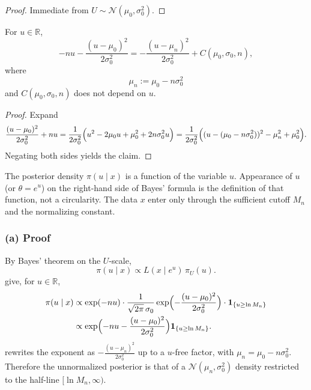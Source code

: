 \documentclass[11pt,a4paper]{article}
\begin{document}
\begin{proof}
Immediate from \(U\sim\mathcal{N}(\mu_0,\sigma_0^2)\).
\end{proof}

\begin{lemma}
\label{lem:p10a-square}
For \(u\in\mathbb{R}\),
\[
-nu-\frac{(u-\mu_0)^2}{2\sigma_0^2}
=
-\frac{(u-\mu_n)^2}{2\sigma_0^2}
+
C(\mu_0,\sigma_0,n),
\]
where
\[
\mu_n
:=
\mu_0-n\sigma_0^2
\]
and \(C(\mu_0,\sigma_0,n)\) does not depend on \(u\).
\end{lemma}

\begin{proof}
Expand
\[
\frac{(u-\mu_0)^2}{2\sigma_0^2}+nu
=
\frac{1}{2\sigma_0^2}\Bigl(u^2-2\mu_0 u+\mu_0^2+2n\sigma_0^2 u\Bigr)
=
\frac{1}{2\sigma_0^2}\Bigl((u-(\mu_0-n\sigma_0^2))^2-\mu_n^2+\mu_0^2\Bigr).
\]
Negating both sides yields the claim.
\end{proof}

\begin{remark*}
The posterior density \(\pi(u\mid x)\) is a function of the variable \(u\). Appearance of \(u\) (or \(\theta=e^u\)) on the right-hand side of Bayes' formula is the definition of that function, not a circularity. The data \(x\) enter only through the sufficient cutoff \(M_n\) and the normalizing constant.
\end{remark*}

\subsubsection{(a) Proof}

By Bayes' theorem on the \(U\)-scale,
\[
\pi(u\mid x)
\propto
L(x\mid e^u)\,\pi_U(u).
\]
 give, for \(u\in\mathbb{R}\),
\begin{align*}
\pi(u\mid x)
&\propto
\exp(-nu)
\cdot
\frac{1}{\sqrt{2\pi}\,\sigma_0}
\exp\Bigl(-\frac{(u-\mu_0)^2}{2\sigma_0^2}\Bigr)
\cdot
\mathbf{1}_{\{u\ge\ln M_n\}}
\\
&\propto
\exp\Bigl(-nu-\frac{(u-\mu_0)^2}{2\sigma_0^2}\Bigr)
\mathbf{1}_{\{u\ge\ln M_n\}}.
\end{align*}
 rewrites the exponent as \(-\frac{(u-\mu_n)^2}{2\sigma_0^2}\) up to a \(u\)-free factor, with \(\mu_n=\mu_0-n\sigma_0^2\). Therefore the unnormalized posterior is that of a \(\mathcal{N}(\mu_n,\sigma_0^2)\) density restricted to the half-line \([\ln M_n,\infty)\).
\end{document}
